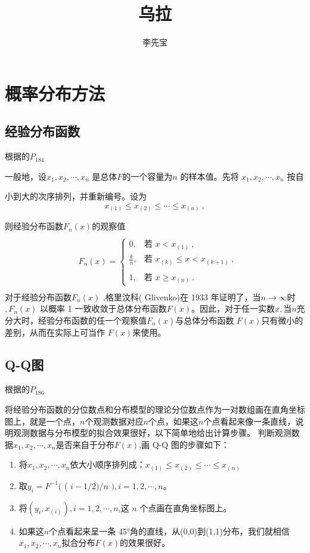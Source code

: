 \documentclass[12pt]{ctexart}
\title{乌拉}
\author{李先宝}
\date{}
\numberwithin{equation}{section} %
\begin{document}
\tableofcontents %
\newpage

\section{概率分布方法}
\subsection{经验分布函数}

根据\cite{司守奎}的$P_{184}$

一般地，设$x_1,x_2,\cdots,x_n$ 是总体$F$的一个容量为$n$ 的样本值。先将 $x_1,x_2,\cdots,x_n$ 按自

小到大的次序排列，并重新编号。设为
$$x_{(1)}\leq x_{(2)}\leq\cdots\leq x_{(n)}\:,$$

则经验分布函数$F_n(x)$的观察值
$$\begin{aligned}&\\&F_{n}(x)=\begin{cases}0,&\text{若 }x<x_{(1)}\:,\\\frac{k}{n},&\text{若 }x_{(k)}\leq x<x_{(k+1)}\:,\\\\1,&\text{若 }x\geqslant x_{(n)}\:.\end{cases}\\\end{aligned}$$
对于经验分布函数$F_n(x)$ ,格里汶科( Glivenko)在 1933 年证明了，当$n\to\infty$时$,F_n(x)$ 以概率 1 一致收敛于总体分布函数$F(x)$。因此，对于任一实数$x,当n$充分大时，经验分布函数的任一个观察值$F_n(x)$与总体分布函数 $F(x)$只有微小的差别，从而在实际上可当作 $F(x)$来使用。

\subsection{Q-Q图}
根据\cite{司守奎}的$P_{186}$

将经验分布函数的分位数点和分布模型的理论分位数点作为一对数组画在直角坐标图上，就是一个点，$n$个观测数据对应$n$个点，如果这$n$个点看起来像一条直线，说明观测数据与分布模型的拟合效果很好，以下简单地给出计算步骤。
判断观测数据$x_1,x_2,\cdots,x_n$是否来自于分布$F(x)$,画 Q-Q 图的步骤如下：
\begin{enumerate}
   

\item 将$x_1,x_2,\cdots,x_n$依大小顺序排列成：$x_{(1)}\leq x_{(2)}\leq\cdots\leq x_{(n)}$
\item 取$y_{i}= F^{- 1}($ ( $i- 1/ 2) / n$ $) , i= 1, 2, \cdots , n$。
\item  将$(y_i,x_{(i)}),i=1,2,\cdots,n$,这 $n$ 个点画在直角坐标图上。
\item 如果这$n$个点看起来呈一条 45°角的直线，从(0,0)到(1,1)分布，我们就相信
$x_{1},x_{2},\cdots,x_{n}$拟合分布$F(x)$的效果很好。
\end{enumerate}
\end{document}
